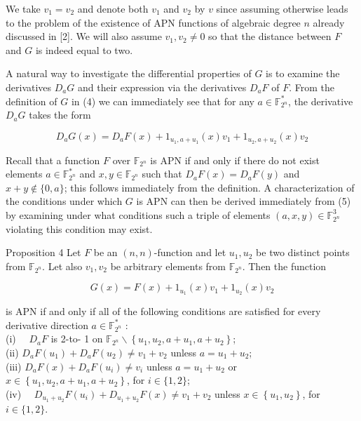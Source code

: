 \documentclass[10pt]{article}
\begin{document}
We take $v_{1}=v_{2}$ and denote both $v_{1}$ and $v_{2}$ by $v$ since assuming otherwise leads to the problem of the existence of APN functions of algebraic degree $n$ already discussed in [2]. We will also assume $v_{1}, v_{2} \neq 0$ so that the distance between $F$ and $G$ is indeed equal to two.

A natural way to investigate the differential properties of $G$ is to examine the derivatives $D_{a} G$ and their expression via the derivatives $D_{a} F$ of $F$. From the definition of $G$ in (4) we can immediately see that for any $a \in \mathbb{F}_{2^{n}}^{*}$, the derivative $D_{a} G$ takes the form


\begin{equation*}
D_{a} G(x)=D_{a} F(x)+1_{u_{1}, a+u_{1}}(x) v_{1}+1_{u_{2}, a+u_{2}}(x) v_{2} \tag{5}
\end{equation*}


Recall that a function $F$ over $\mathbb{F}_{2^{n}}$ is APN if and only if there do not exist elements $a \in \mathbb{F}_{2^{n}}^{*}$ and $x, y \in \mathbb{F}_{2^{n}}$ such that $D_{a} F(x)=D_{a} F(y)$ and $x+y \notin\{0, a\}$; this follows immediately from the definition. A characterization of the conditions under which $G$ is APN can then be derived immediately from (5) by examining under what conditions such a triple of elements $(a, x, y) \in \mathbb{F}_{2^{n}}^{3}$ violating this condition may exist.

Proposition 4 Let $F$ be an $(n, n)$-function and let $u_{1}, u_{2}$ be two distinct points from $\mathbb{F}_{2^{n}}$. Let also $v_{1}, v_{2}$ be arbitrary elements from $\mathbb{F}_{2^{n}}$. Then the function

$$
G(x)=F(x)+1_{u_{1}}(x) v_{1}+1_{u_{2}}(x) v_{2}
$$

is APN if and only if all of the following conditions are satisfied for every derivative direction $a \in \mathbb{F}_{2^{n}}^{*}$ :\\
(i) $\quad D_{a} F$ is 2-to- 1 on $\mathbb{F}_{2^{n}} \backslash\left\{u_{1}, u_{2}, a+u_{1}, a+u_{2}\right\}$;\\
(ii) $D_{a} F\left(u_{1}\right)+D_{a} F\left(u_{2}\right) \neq v_{1}+v_{2}$ unless $a=u_{1}+u_{2}$;\\
(iii) $D_{a} F(x)+D_{a} F\left(u_{i}\right) \neq v_{i}$ unless $a=u_{1}+u_{2}$ or $x \in\left\{u_{1}, u_{2}, a+u_{1}, a+u_{2}\right\}$, for $i \in\{1,2\}$;\\
(iv) $\quad D_{u_{1}+u_{2}} F\left(u_{i}\right)+D_{u_{1}+u_{2}} F(x) \neq v_{1}+v_{2}$ unless $x \in\left\{u_{1}, u_{2}\right\}$, for $i \in\{1,2\}$.
\end{document}
